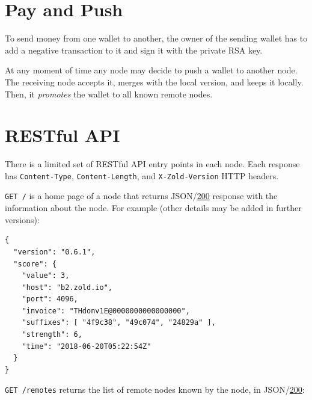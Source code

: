 \documentclass[11pt,oneside]{article}
\newcommand\dd[1]{\colorbox{gray!30}{\texttt{#1}}}
\begin{document}
\section{Pay and Push}

To send money from one wallet to another, the owner of the sending wallet
has to add a negative transaction to it and sign it with the private RSA key.

At any moment of time any node may decide to push a wallet to another node.
The receiving node accepts it, merges with the local version, and keeps it locally.
Then, it \emph{promotes} the wallet to all known remote nodes.

\section{RESTful API}\label{sec:api}

There is a limited set of RESTful API entry points in each node.
Each response has \dd{Content-Type},
\dd{Content-Length}, and \dd{X-Zold-Version}
HTTP headers.

\dd{GET /} is a home page of a node that returns
JSON/\href{https://www.w3.org/Protocols/rfc2616/rfc2616-sec10.html#sec10.2.1}{200}
response with the
information about the node. For example (other details may be added in
further versions):

\begin{verbatim}
{
  "version": "0.6.1",
  "score": {
    "value": 3,
    "host": "b2.zold.io",
    "port": 4096,
    "invoice": "THdonv1E@0000000000000000",
    "suffixes": [ "4f9c38", "49c074", "24829a" ],
    "strength": 6,
    "time": "2018-06-20T05:22:54Z"
  }
}
\end{verbatim}

\dd{GET /remotes} returns the list of remote nodes known by the node,
in JSON/\href{https://www.w3.org/Protocols/rfc2616/rfc2616-sec10.html#sec10.2.1}{200}:
\end{document}
